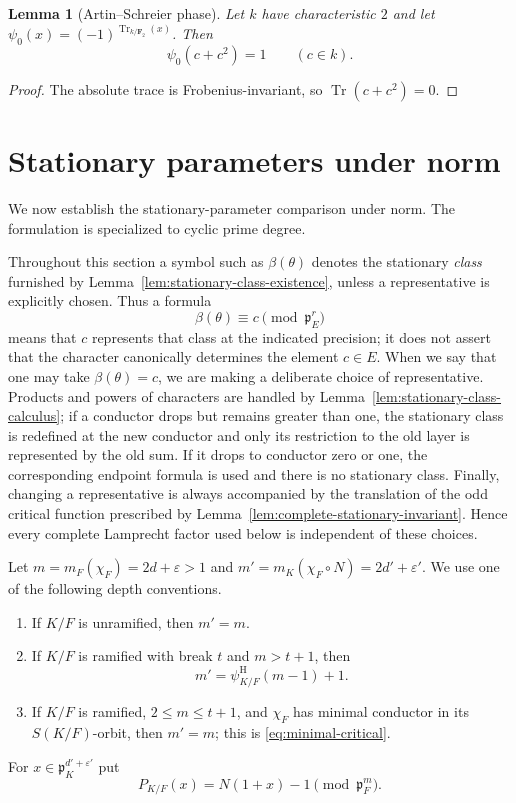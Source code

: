 \documentclass[11pt]{amsart}
\newtheorem{lemma}[theorem]{Lemma}
\theoremstyle{definition}
\theoremstyle{remark}
\newcommand{\F}{\mathbf F}
\newcommand{\p}{\mathfrak p}
\newcommand{\Tr}{\operatorname{Tr}}
\newcommand{\HerbPsi}{\psi^{\mathrm H}}
\begin{document}
\begin{lemma}[Artin--Schreier phase]\label{lem:AS-phase-new}
Let $k$ have characteristic $2$ and let
$\psi_0(x)=(-1)^{\Tr_{k/\F_2}(x)}$.  Then
\[
 \psi_0(c+c^2)=1\qquad(c\in k).
\]
\end{lemma}

\begin{proof}
The absolute trace is Frobenius-invariant, so
$\Tr(c+c^2)=0$.
\end{proof}

\section{Stationary parameters under norm}\label{sec:stationary-parameters}

We now establish the stationary-parameter comparison under norm.  The
formulation is specialized to cyclic prime degree.

Throughout this section a symbol such as $\beta(\theta)$ denotes the
stationary \emph{class} furnished by
Lemma~\ref{lem:stationary-class-existence}, unless a representative is
explicitly chosen.  Thus a formula
\[
 \beta(\theta)\equiv c\pmod{\p_E^r}
\]
means that $c$ represents that class at the indicated precision; it
does not assert that the character canonically determines the element
$c\in E$.  When we say that one may take $\beta(\theta)=c$, we are
making a deliberate choice of representative.  Products and powers of
characters are handled by Lemma~\ref{lem:stationary-class-calculus}; if
a conductor drops but remains greater than one, the stationary class is
redefined at the new conductor and only its restriction to the old
layer is represented by the old sum.  If it drops to conductor zero or
one, the corresponding endpoint formula is used and there is no
stationary class.  Finally, changing a representative is always accompanied
by the translation of the odd critical function prescribed by
Lemma~\ref{lem:complete-stationary-invariant}.  Hence every complete
Lamprecht factor used below is independent of these choices.

Let
$m=m_F(\chi_F)=2d+\varepsilon>1$ and
$m'=m_K(\chi_F\circ N)=2d'+\varepsilon'$.  We use one of the following depth
conventions.
\begin{enumerate}[label=(\roman*)]
\item If $K/F$ is unramified, then $m'=m$.
\item If $K/F$ is ramified with break $t$ and $m>t+1$, then
\[
 m'=\HerbPsi_{K/F}(m-1)+1.
\]
\item If $K/F$ is ramified, $2\le m\le t+1$, and $\chi_F$ has minimal
      conductor in its $S(K/F)$-orbit, then $m'=m$;
      this is \eqref{eq:minimal-critical}.
\end{enumerate}
For $x\in\p_K^{d'+\varepsilon'}$ put
\begin{equation}\label{eq:P-map}
 P_{K/F}(x)=N(1+x)-1\pmod{\p_F^m}.
\end{equation}
\end{document}
